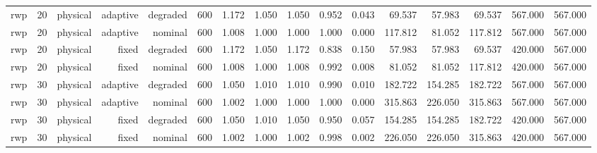 \begin{tabular}{lrrrrrrrrrrrrrrr}
rwp & 20 & physical & adaptive & degraded & 600 & 1.172 & 1.050 & 1.050 & 0.952 & 0.043 & 69.537 & 57.983 & 69.537 & 567.000 & 567.000 \\
rwp & 20 & physical & adaptive & nominal & 600 & 1.008 & 1.000 & 1.000 & 1.000 & 0.000 & 117.812 & 81.052 & 117.812 & 567.000 & 567.000 \\
rwp & 20 & physical & fixed & degraded & 600 & 1.172 & 1.050 & 1.172 & 0.838 & 0.150 & 57.983 & 57.983 & 69.537 & 420.000 & 567.000 \\
rwp & 20 & physical & fixed & nominal & 600 & 1.008 & 1.000 & 1.008 & 0.992 & 0.008 & 81.052 & 81.052 & 117.812 & 420.000 & 567.000 \\
rwp & 30 & physical & adaptive & degraded & 600 & 1.050 & 1.010 & 1.010 & 0.990 & 0.010 & 182.722 & 154.285 & 182.722 & 567.000 & 567.000 \\
rwp & 30 & physical & adaptive & nominal & 600 & 1.002 & 1.000 & 1.000 & 1.000 & 0.000 & 315.863 & 226.050 & 315.863 & 567.000 & 567.000 \\
rwp & 30 & physical & fixed & degraded & 600 & 1.050 & 1.010 & 1.050 & 0.950 & 0.057 & 154.285 & 154.285 & 182.722 & 420.000 & 567.000 \\
rwp & 30 & physical & fixed & nominal & 600 & 1.002 & 1.000 & 1.002 & 0.998 & 0.002 & 226.050 & 226.050 & 315.863 & 420.000 & 567.000 \\
\bottomrule
\end{tabular}